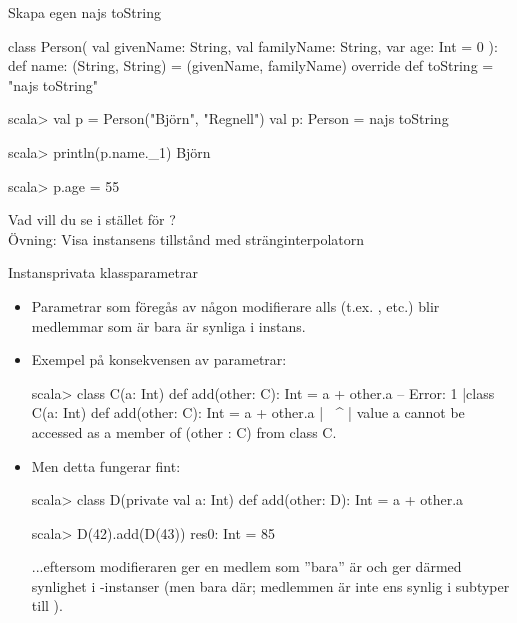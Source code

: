 \begin{Slide}{Skapa egen najs toString}
\begin{Code}[basicstyle=\SlideFontSize{6.9}{9}\ttfamily]
class Person(
  val givenName: String, 
  val familyName: String, 
  var age: Int = 0
):
  def name: (String, String) = (givenName, familyName)
  override def toString = "najs toString"
\end{Code}
\begin{REPLnonum}[basicstyle=\SlideFontSize{7}{9}\ttfamily\color{white}]
scala> val p = Person("Björn", "Regnell")
val p: Person = najs toString

scala> println(p.name._1)
Björn

scala> p.age = 55 

\end{REPLnonum}
Vad vill du se i stället för ?\\Övning: Visa instansens tillstånd med stränginterpolatorn  
\end{Slide}

\begin{Slide}{Instansprivata klassparametrar}\SlideFontSmall
\setlength{\leftmargini}{0pt}

\begin{itemize}
\item Parametrar som  föregås av någon modifierare alls (t.ex. ,  etc.) blir medlemmar som är bara är synliga i  instans.
\item Exempel på konsekvensen av  parametrar:
\begin{REPL}[basicstyle=\SlideFontSize{6.7}{9}\ttfamily\color{white}]
scala> class C(a: Int){ def add(other: C): Int = a + other.a }
-- Error:
1 |class C(a: Int){ def add(other: C): Int = a + other.a }
  |                                              ^^^^^^^
  | value a cannot be accessed as a member of (other : C) from class C.
\end{REPL}
\item Men detta fungerar fint:
\begin{REPL}
scala> class D(private val a: Int){ def add(other: D): Int = a + other.a }

scala> D(42).add(D(43))
res0: Int = 85
\end{REPL}
...eftersom modifieraren  ger en medlem som ''bara'' är  och ger därmed synlighet i  -instanser (men bara där; medlemmen är inte ens synlig i subtyper till ).
\end{itemize}

\end{Slide}

